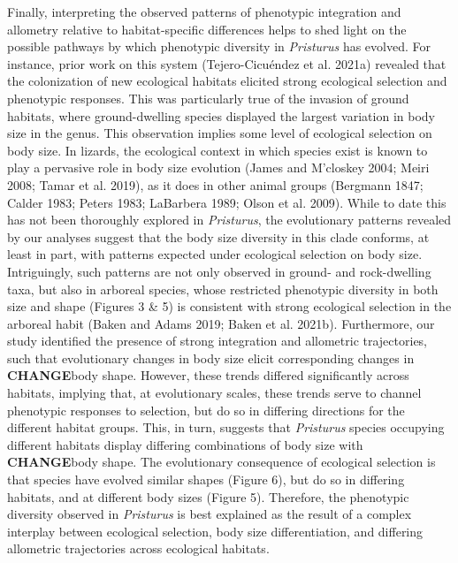 \documentclass[
  11pt,
]{article}
\begin{document}
Finally, interpreting the observed patterns of phenotypic integration
and allometry relative to habitat-specific differences helps to shed
light on the possible pathways by which phenotypic diversity in
\emph{Pristurus} has evolved. For instance, prior work on this system
(Tejero-Cicuéndez et al. 2021a) revealed that the colonization of new
ecological habitats elicited strong ecological selection and phenotypic
responses. This was particularly true of the invasion of ground
habitats, where ground-dwelling species displayed the largest variation
in body size in the genus. This observation implies some level of
ecological selection on body size. In lizards, the ecological context in
which species exist is known to play a pervasive role in body size
evolution (James and M'closkey 2004; Meiri 2008; Tamar et al. 2019), as
it does in other animal groups (Bergmann 1847; Calder 1983; Peters 1983;
LaBarbera 1989; Olson et al. 2009). While to date this has not been
thoroughly explored in \emph{Pristurus}, the evolutionary patterns
revealed by our analyses suggest that the body size diversity in this
clade conforms, at least in part, with patterns expected under
ecological selection on body size. Intriguingly, such patterns are not
only observed in ground- and rock-dwelling taxa, but also in arboreal
species, whose restricted phenotypic diversity in both size and shape
(Figures 3 \& 5) is consistent with strong ecological selection in the
arboreal habit (Baken and Adams 2019; Baken et al. 2021b). Furthermore,
our study identified the presence of strong integration and allometric
trajectories, such that evolutionary changes in body size elicit
corresponding changes in \textbf{CHANGE}body shape. However, these
trends differed significantly across habitats, implying that, at
evolutionary scales, these trends serve to channel phenotypic responses
to selection, but do so in differing directions for the different
habitat groups. This, in turn, suggests that \emph{Pristurus} species
occupying different habitats display differing combinations of body size
with \textbf{CHANGE}body shape. The evolutionary consequence of
ecological selection is that species have evolved similar shapes (Figure
6), but do so in differing habitats, and at different body sizes (Figure
5). Therefore, the phenotypic diversity observed in \emph{Pristurus} is
best explained as the result of a complex interplay between ecological
selection, body size differentiation, and differing allometric
trajectories across ecological habitats.

\newpage
\end{document}
